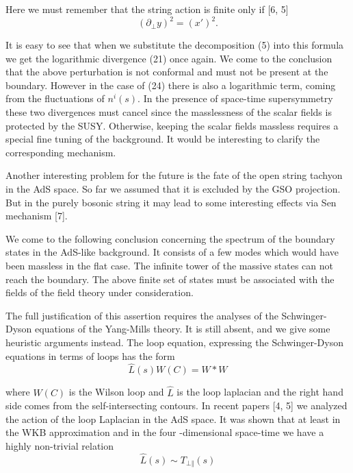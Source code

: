 \documentclass[a4paper,12pt]{article}
\begin{document}
Here we must remember that the string action is finite only if [6, 5] 
\begin{equation}
\left( \partial _{\bot }y\right) ^{2}=\left( x'\right) ^{2}.
\end{equation}

It is easy to see that when we substitute the decomposition (5) into this
formula we get the logarithmic divergence (21) once again. We come to the
conclusion that the above perturbation is not conformal and must not be
present at the boundary. However in the case of (24) there is also a
logarithmic term, coming from the fluctuations of $n^{i}(s)$. In the
presence of space-time supersymmetry these two divergences must cancel since
the masslessness of the scalar fields is protected by the SUSY. Otherwise,
keeping the scalar fields massless requires a special fine tuning of the
background. It would be interesting to clarify the corresponding mechanism.%
\newline

Another interesting problem for the future is the fate of the open string
tachyon in the AdS space. So far we assumed that it is excluded by the GSO
projection. But in the purely bosonic string it may lead to some
interesting effects via Sen mechanism [7].

We come to the following conclusion concerning the spectrum of the boundary
states in the AdS-like background. It consists of a few modes which would
have been massless in the flat case. The infinite tower of the massive
states can not reach the boundary. The above finite set of states must be
associated with the fields of the field theory under consideration.

The full justification of this assertion requires the analyses of the
Schwinger-Dyson equations of the Yang-Mills theory. It is still absent, and
we give some heuristic arguments instead. The loop equation, expressing the
Schwinger-Dyson equations in terms of loops has the form 
\begin{equation}
\widehat{L}(s)W(C)=W\ast W
\end{equation}

where $W(C)$ is the Wilson loop and $\widehat{L}$ is the loop laplacian and
the right hand side comes from the self-intersecting contours. In recent
papers [4, 5] we analyzed the action of the loop Laplacian in the AdS space.
It was shown that at least in the WKB approximation and in the four
-dimensional space-time we have a highly non-trivial relation 
\begin{equation}
\widehat{L}(s)\sim T_{\bot \Vert }(s)
\end{equation}
\end{document}
